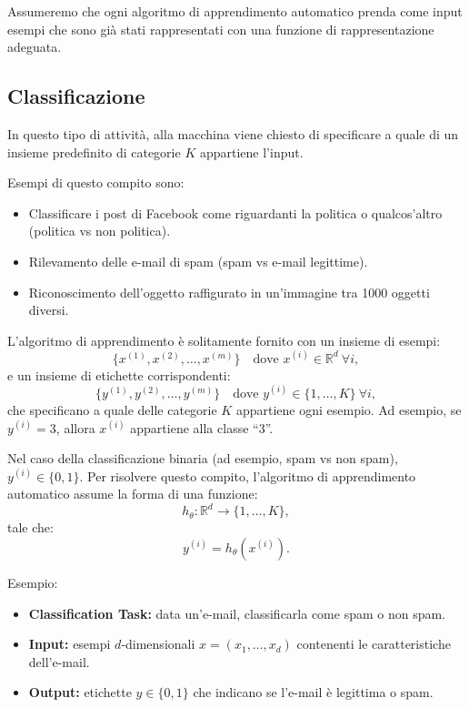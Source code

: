Assumeremo che ogni algoritmo di apprendimento automatico prenda come input esempi che sono gi\`a stati rappresentati con una funzione di rappresentazione adeguata.

\subsection{Classificazione}

In questo tipo di attivit\`a, alla macchina viene chiesto di specificare a quale di un insieme predefinito di categorie $K$ appartiene l'input.

\noindent
Esempi di questo compito sono:
\begin{itemize}
\item Classificare i post di Facebook come riguardanti la politica o qualcos'altro (politica vs non politica).
\item Rilevamento delle e-mail di spam (spam vs e-mail legittime).
\item Riconoscimento dell'oggetto raffigurato in un'immagine tra 1000 oggetti diversi.
\end{itemize}

\noindent
L'algoritmo di apprendimento \`e solitamente fornito con un insieme di esempi:
\[
\{x^{(1)}, x^{(2)}, \dots, x^{(m)}\}
\quad \text{dove } x^{(i)} \in \mathbb{R}^{d}\ \forall i,
\]
e un insieme di etichette corrispondenti:
\[
\{y^{(1)}, y^{(2)}, \dots, y^{(m)}\}
\quad \text{dove } y^{(i)} \in \{1, \dots, K\}\ \forall i,
\]
che specificano a quale delle categorie $K$ appartiene ogni esempio. Ad esempio, se $y^{(i)} = 3$, allora $x^{(i)}$ appartiene alla classe ``3''.

Nel caso della classificazione binaria (ad esempio, spam vs non spam), $y^{(i)} \in \{0,1\}$. Per risolvere questo compito, l'algoritmo di apprendimento automatico assume la forma di una funzione:
\[
h_\theta: \mathbb{R}^{d} \rightarrow \{1, \dots, K\},
\]
tale che:
\[
y^{(i)} = h_\theta(x^{(i)}).
\]

\noindent
Esempio:
\begin{itemize}
    \item \textbf{Classification Task:} data un'e-mail, classificarla come spam o non spam.
    \item \textbf{Input:} esempi $d$-dimensionali $x=(x_1,\dots,x_d)$ contenenti le caratteristiche dell'e-mail.
    \item \textbf{Output:} etichette $y \in \{0,1\}$ che indicano se l'e-mail \`e legittima o spam.
\end{itemize}

